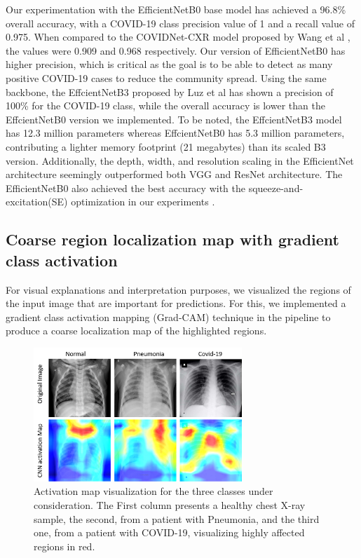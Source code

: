 Our experimentation with the EfficientNetB0 base model has achieved a 96.8\% overall accuracy, with a COVID-19 class precision  value of 1 and  a recall value of 0.975. When compared to the COVIDNet-CXR model proposed by Wang et al \cite{wang2020covid}, the values were 0.909 and 0.968 respectively. Our version of EfficientNetB0 has higher precision, which is critical as the goal is to be able to detect as many positive COVID-19 cases to reduce the community spread.
Using the same backbone, the EffcientNetB3 proposed by Luz et al\cite{luz2020efficient} has shown a precision of 100\% for the COVID-19 class, while the overall accuracy is lower than the EffcientNetB0 version we implemented. To be noted, the EffcientNetB3 model has 12.3 million parameters whereas EffcientNetB0 has 5.3 million parameters, contributing a lighter memory footprint (21 megabytes) than its scaled B3 version. Additionally, the depth, width, and resolution scaling in the EfficientNet architecture seemingly outperformed both VGG and ResNet architecture. The EfficientNetB0  also achieved the best accuracy with the squeeze-and-excitation(SE) optimization in our experiments .

\subsection{Coarse region localization map with gradient class activation}


 For visual explanations and interpretation purposes, we visualized the regions of the input image that are important for predictions. For this, we implemented a gradient class activation mapping (Grad-CAM) technique \cite{selvaraju2017grad} in the pipeline to produce a coarse localization map of the highlighted regions. 
 
 
 \begin{figure}[h!]
\centering
\includegraphics[width=0.7\textwidth]{images/Picture2_3 class.png}
   \caption{Activation map visualization for the three classes under consideration. The First column presents a healthy chest X-ray sample, the second, from a patient with
Pneumonia, and the third one, from a patient with COVID-19, visualizing highly affected regions in red.}
\label{fig:activation_map_2}
\end{figure}

